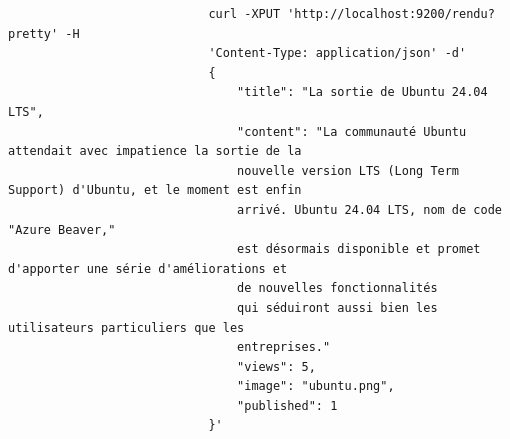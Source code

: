 \documentclass[a4paper,11pt]{article}
\begin{document}
\begin{enumerate}
                    \begin{tcolorbox}[colback=lightgray!6, colframe=black, left=-50mm, right=5mm, top=2mm, bottom=-2mm, boxrule=0.1mm]
                        \begin{verbatim}
                            curl -XPUT 'http://localhost:9200/rendu?pretty' -H 
                            'Content-Type: application/json' -d'
                            {
                                "title": "La sortie de Ubuntu 24.04 LTS",   
                                "content": "La communauté Ubuntu attendait avec impatience la sortie de la 
                                nouvelle version LTS (Long Term Support) d'Ubuntu, et le moment est enfin 
                                arrivé. Ubuntu 24.04 LTS, nom de code "Azure Beaver," 
                                est désormais disponible et promet d'apporter une série d'améliorations et 
                                de nouvelles fonctionnalités 
                                qui séduiront aussi bien les utilisateurs particuliers que les 
                                entreprises."
                                "views": 5,
                                "image": "ubuntu.png",
                                "published": 1
                            }'
                        \end{verbatim}
                    \end{tcolorbox}
            \end{enumerate}
            
\end{document}
